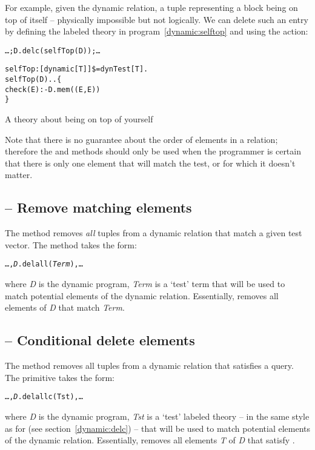 For example, given the  dynamic relation, a tuple representing a block being on top of itself -- physically impossible but not logically. We can delete such an entry by defining the labeled theory in program~\vref{dynamic:selftop} and
using the action:
\begin{alltt}
\ldots;D.delc(selfTop(D));\ldots
\end{alltt}
\begin{program}
\begin{boxed}
\begin{alltt}
selfTop:[dynamic[T]]\$=dynTest[T].
selfTop(D)..\{
  check(E) :- D.mem((E,E))
\}
\end{alltt}
\end{boxed}
\caption{\label{dynamic:selftop}A theory about being on top of yourself}
\end{program}

\begin{aside}
Note that there is no guarantee about the order of elements in a relation; therefore the  and  methods should only be used when the programmer is certain that there is only one element that will match the test, or for which it doesn't matter.
\end{aside}

\subsection{ -- Remove matching elements}
\label{dynamic:delall}
The  method removes \emph{all} tuples from a dynamic relation that match a given test vector. The  method takes the form:
\begin{alltt}
\ldots,\emph{D}.delall(\emph{Term}),\ldots
\end{alltt}
where \emph{D} is the dynamic program, \emph{Term} is a `test' term that will be used to match potential elements of the dynamic relation. Essentially,  removes all elements of \emph{D} that match \emph{Term}.

\subsection{ -- Conditional delete elements}
\label{dynamic:delallc}
The  method removes all tuples from a dynamic relation that satisfies a query. The  primitive takes the form:
\begin{alltt}
\ldots,\emph{D}.delallc(Tst),\ldots
\end{alltt}
where \emph{D} is the dynamic program, \emph{Tst} is a `test' labeled theory -- in the same style as for  (see section~\vref{dynamic:delc}) -- that will be used to match potential elements of the dynamic relation. Essentially,  removes all elements \emph{T} of \emph{D} that satisfy .

